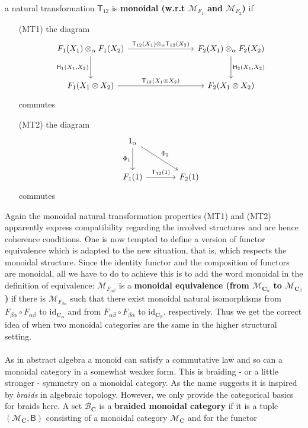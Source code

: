 a natural transformation $\mathsf{T}_{12}$ is \textbf{monoidal (w.r.t $\mathcal{M}_{F_{1}}$ and $\mathcal{M}_{F_{2}}$)} if
\begin{enumerate}
\item[(MT1)]
the diagram
\[
\begin{tikzcd}[row sep=large,column sep=8em]
  F_{1}(X_{1})
  \otimes_{\alpha}
  F_{1}(X_{2})
  \arrow{r}{\mathsf{T}_{12}(X_{1}) \otimes_{\alpha} \mathsf{T}_{12}(X_{2})}
  \arrow[swap]{d}{\mathsf{H}_{1}(X_{1},X_{2})}
  &
  F_{2}(X_{1})
  \otimes_{\alpha}
  F_{2}(X_{2})
  \arrow{d}{\mathsf{H}_{2}(X_{1},X_{2})}
  \\
  F_{1}(X_{1} \otimes X_{2})
  \arrow{r}{\mathsf{T}_{12}(X_{1} \otimes X_{2})}
  &
  F_{2}(X_{1} \otimes X_{2})
\end{tikzcd}
\]
commutes
\item[(MT2)]
the diagram
\[
\begin{tikzcd}[sep=large]
  1_{\alpha}
  \arrow{dr}{\Phi_{2}}
  \arrow{d}[swap]{\Phi_{1}}
  &
  \\
  F_{1}(1)
  \arrow{r}{\mathsf{T}_{12}(1)}
  &
  F_{2}(1)
\end{tikzcd}
\]
commutes
\end{enumerate}
Again the monoidal natural transformation properties (MT1) and (MT2) apparently express compatibility regarding the involved structures and are hence coherence conditions. One is now tempted to define a version of functor equivalence which is adapted to the new situation, that is, which respects the monoidal structure. Since the identity functor and the composition of functors are monoidal, all we have to do to achieve this is to add the word monoidal in the definition of equivalence: $\mathcal{M}_{F_{\alpha\beta}}$ is a \textbf{monoidal equivalence (from $\mathcal{M}_{\mathbf{C}_{\alpha}}$ to $\mathcal{M}_{\mathbf{C}_{\beta}}$)} if there is $\mathcal{M}_{F_{\beta\alpha}}$ such that there exist monoidal natural isomorphisms from $F_{\beta\alpha} \circ F_{\alpha\beta}$ to $\mathrm{id}_{\mathbf{C_{\alpha}}}$ and from $F_{\alpha\beta} \circ F_{\beta\alpha} $ to $\mathrm{id}_{\mathbf{C_{\beta}}}$, respectively. Thus we get the correct idea of when two monoidal categories are {\glqq}the same{\grqq} in the higher structural setting.
\\\\
As in abstract algebra a monoid can satisfy a commutative law and so can a monoidal category in a somewhat weaker form. This is braiding - or a little stronger - symmetry on a monoidal category. As the name suggests it is inspired by \textit{braids} in algebraic topology. However, we only provide the categorical basics for braids here. A set $\mathcal{B}_{\mathbf{C}}$ is a \textbf{braided monoidal category} if it is a tuple $(\mathcal{M}_{\mathbf{C}},\mathsf{B})$ consisting of a monoidal category $\mathcal{M}_{\mathbf{C}}$ and for the functor
